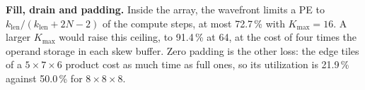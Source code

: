 \textbf{Fill, drain and padding.} Inside the array, the wavefront limits a PE to $k_{\mathrm{len}} / (k_{\mathrm{len}} + 2N - 2)$ of the compute steps, at most 72.7\,\% with $K_{\max} = 16$. A larger $K_{\max}$ would raise this ceiling, to 91.4\,\% at 64, at the cost of four times the operand storage in each skew buffer. Zero padding is the other loss: the edge tiles of a $5 \times 7 \times 6$ product cost as much time as full ones, so its utilization is 21.9\,\% against 50.0\,\% for $8 \times 8 \times 8$.

